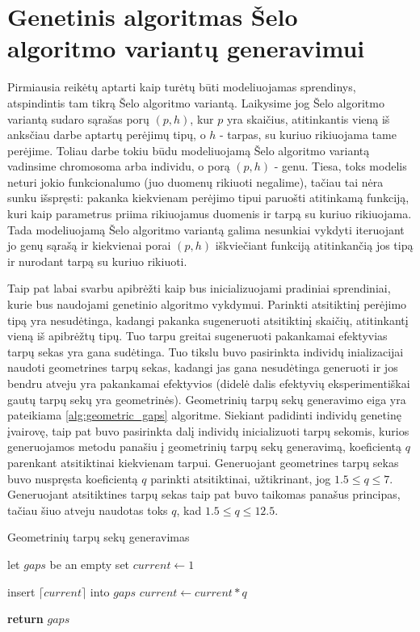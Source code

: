 \documentclass{VUMIFInfBakalaurinis}
\begin{document}
\section{Genetinis algoritmas Šelo algoritmo variantų generavimui}


Pirmiausia reikėtų aptarti kaip turėtų būti modeliuojamas sprendinys, atspindintis tam tikrą Šelo algoritmo variantą.
Laikysime jog Šelo algoritmo variantą sudaro sąrašas porų $(p, h)$, kur $p$ yra skaičius, atitinkantis vieną iš anksčiau darbe aptartų perėjimų tipų,
o $h$ - tarpas, su kuriuo rikiuojama tame perėjime.
Toliau darbe tokiu būdu modeliuojamą Šelo algoritmo variantą vadinsime chromosoma arba individu, o porą $(p, h)$ - genu.
Tiesa, toks modelis neturi jokio funkcionalumo (juo duomenų rikiuoti negalime), tačiau tai nėra sunku išspręsti: pakanka kiekvienam perėjimo tipui
paruošti atitinkamą funkciją, kuri kaip parametrus priima rikiuojamus duomenis ir tarpą su kuriuo rikiuojama.
Tada modeliuojamą Šelo algoritmo variantą galima nesunkiai vykdyti iteruojant jo genų sąrašą ir kiekvienai porai $(p, h)$ iškviečiant funkciją atitinkančią jos tipą ir nurodant tarpą su kuriuo rikiuoti.

Taip pat labai svarbu apibrėžti kaip bus inicializuojami pradiniai sprendiniai, kurie bus naudojami genetinio algoritmo vykdymui.
Parinkti atsitiktinį perėjimo tipą yra nesudėtinga, kadangi pakanka sugeneruoti atsitiktinį skaičių, atitinkantį vieną iš apibrėžtų tipų.
Tuo tarpu greitai sugeneruoti pakankamai efektyvias tarpų sekas yra gana sudėtinga.
Tuo tikslu buvo pasirinkta individų inializacijai naudoti geometrines tarpų sekas, kadangi jas gana nesudėtinga generuoti
ir jos bendru atveju yra pakankamai efektyvios (didelė dalis efektyvių eksperimentiškai gautų tarpų sekų yra geometrinės).
Geometrinių tarpų sekų generavimo eiga yra pateikiama \ref{alg:geometric_gaps} algoritme.
Siekiant padidinti individų genetinę įvairovę, taip pat buvo pasirinkta dalį individų inicializuoti
tarpų sekomis, kurios generuojamos metodu panašiu į geometrinių tarpų sekų generavimą, koeficientą $q$ parenkant atsitiktinai kiekvienam tarpui.
Generuojant geometrines tarpų sekas buvo nuspręsta koeficientą $q$ parinkti atsitiktinai, užtikrinant, jog $1.5 \leq q \leq 7$.
Generuojant atsitiktines tarpų sekas taip pat buvo taikomas panašus principas, tačiau šiuo atveju naudotas toks $q$, kad $1.5 \leq q \leq 12.5$.

\begin{algorithm}[H]
  \caption{Geometrinių tarpų sekų generavimas}\label{alg:geometric_gaps}
  \begin{algorithmic}[1]
      \State let $gaps$ be an empty set
      \State $current \gets 1$
      
        \State insert $\lceil current \rceil$ into $gaps$
        \State $current \gets current * q$ 
      \EndWhile

      \State \textbf{return} $gaps$
    \EndProcedure
  \end{algorithmic}
\end{algorithm}
\end{document}
